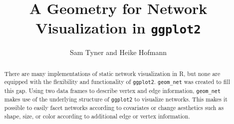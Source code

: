 \documentclass[11pt]{article}\usepackage[]{graphicx}\usepackage[]{color}
\title{A Geometry for Network Visualization in \MakeLowercase{\texttt{ggplot2}}}
\author{Sam Tyner and Heike Hofmann}
\date{} %
\makeatletter
\newenvironment{kframe}{%
 \def\at@end@of@kframe{}%
 \ifinner\ifhmode%
  \def\at@end@of@kframe{\end{minipage}}%
  \begin{minipage}{\columnwidth}%
 \fi\fi%
 \def\FrameCommand##1{\hskip\@totalleftmargin \hskip-\fboxsep
 \colorbox{shadecolor}{##1}\hskip-\fboxsep
     \hskip-\linewidth \hskip-\@totalleftmargin \hskip\columnwidth}%
 \MakeFramed {\advance\hsize-\width
   \@totalleftmargin\z@ \linewidth\hsize
   \@setminipage}}%
 {\par\unskip\endMakeFramed%
 \at@end@of@kframe}
\newenvironment{knitrout}{}{} %
\makeatother
\begin{document}
\maketitle
\begin{abstract}
There are many implementations of static network visualization in R, but none are equipped with the flexibility and functionality of \texttt{ggplot2}.  \texttt{geom\_net} was created to fill this gap. Using two data frames to describe vertex and edge information, \texttt{geom\_net} makes use of the underlying structure of \texttt{ggplot2} to visualize networks. This makes it possible to easily facet networks according to covariates  or change aesthetics such as shape, size, or color according to additional edge or vertex information.
\end{abstract}

\begin{knitrout}
\color{fgcolor}\begin{kframe}


{\ttfamily\noindent\bfseries\color{errorcolor}{\#\# Error in eval(expr, envir, enclos): object 'email' not found}}

{\ttfamily\noindent\bfseries\color{errorcolor}{\#\# Error in eval(expr, envir, enclos): object 'email' not found}}

{\ttfamily\noindent\bfseries\color{errorcolor}{\#\# Error in readChar(con, 5L, useBytes = TRUE): cannot open the connection}}

{\ttfamily\noindent\bfseries\color{errorcolor}{\#\# Error in eval(expr, envir, enclos): object 'protein' not found}}\end{kframe}
\end{knitrout}
\end{document}
